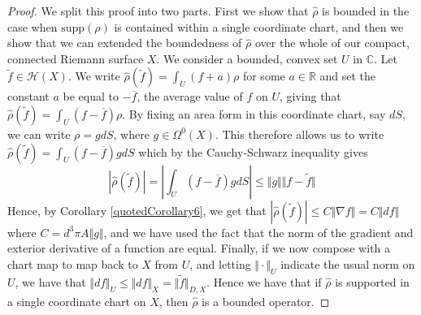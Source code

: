 \documentclass[11pt]{report}
\theoremstyle{definition}
\begin{document}
\begin{proof}
  We split this proof into two parts. First we show that $\hat{\rho}$ is bounded in the case when $\text{supp}(\rho)$ is contained within a single coordinate chart, and then we show that we can extended the boundedness of $\hat{\rho}$ over the whole of our compact, connected Riemann surface $X$.
  We consider a bounded, convex set $U$ in $\mathbb{C}$. Let $\tilde{f} \in \mathcal{H}(X)$. We write $\hat{\rho}(\tilde{f}) = \int_U (f + a) \rho$ for some $a \in \mathbb{R}$ and set the constant $a$ be equal to $-\overline{f}$, the average value of $f$ on $U$, giving that  $\hat{\rho}(\tilde{f}) = \int_U (f - \overline{f}) \rho$. By fixing an area form in this coordinate chart, say $dS$, we can write $\rho = g dS$, where $g \in \Omega^0(X)$. This therefore allows us to write $\hat{\rho}(\tilde{f}) = \int_U (f - \overline{f}) g dS$ which by the Cauchy-Schwarz inequality gives
  \[ |\hat{\rho}(\tilde{f})| = \left| \int_U (f - \overline{f}) g dS \right| \leq \Vert g \Vert \Vert f-\tilde{f} \Vert  \]
  Hence, by Corollary \ref{quotedCorollary6}, we get that $|\hat{\rho}(\tilde{f})| \leq C \Vert \nabla f \Vert = C \Vert df \Vert$ where $C = d^3\pi A \Vert g \Vert$, and we have used the fact that the norm of the gradient and exterior derivative of a function are equal.
  Finally, if we now compose with a chart map to map back to $X$ from $U$, and letting $ \Vert \cdot \Vert_U$ indicate the usual norm on $U$, we have that $ \Vert df \Vert_U \leq \Vert df \Vert_X = \Vert \tilde{f} \Vert_{D,X}$. Hence we have that if $\hat{\rho}$ is supported in a single coordinate chart on $X$, then $\hat{\rho}$ is a bounded operator.


\end{proof}
\end{document}
